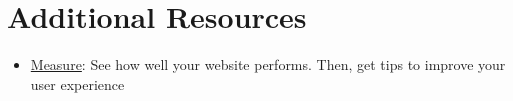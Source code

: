\section{Additional Resources}

\begin{itemize}[leftmargin=*]
    \item \href{https://web.dev/measure/}{Measure}: See how well your website performs. Then, get tips to improve your user experience
\end{itemize}
